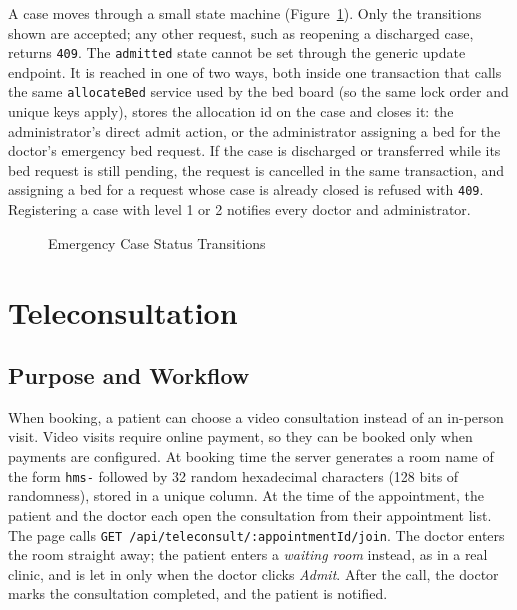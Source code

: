 A case moves through a small state machine (Figure~\ref{fig:erstates}). Only the transitions shown are accepted; any other request, such as reopening a discharged case, returns \texttt{409}. The \texttt{admitted} state cannot be set through the generic update endpoint. It is reached in one of two ways, both inside one transaction that calls the same \texttt{allocateBed} service used by the bed board (so the same lock order and unique keys apply), stores the allocation id on the case and closes it: the administrator's direct admit action, or the administrator assigning a bed for the doctor's emergency bed request. If the case is discharged or transferred while its bed request is still pending, the request is cancelled in the same transaction, and assigning a bed for a request whose case is already closed is refused with \texttt{409}. Registering a case with level 1 or 2 notifies every doctor and administrator.

\begin{figure}[H]
\centering
{}
\caption{Emergency Case Status Transitions}
\label{fig:erstates}
\end{figure}

\FloatBarrier
\section{Teleconsultation}
\label{sec:mod-tele}

\subsection{Purpose and Workflow}

When booking, a patient can choose a video consultation instead of an in-person visit. Video visits require online payment, so they can be booked only when payments are configured. At booking time the server generates a room name of the form \texttt{hms-} followed by 32 random hexadecimal characters (128 bits of randomness), stored in a unique column. At the time of the appointment, the patient and the doctor each open the consultation from their appointment list. The page calls \texttt{GET /api/teleconsult/:appointmentId/join}. The doctor enters the room straight away; the patient enters a \emph{waiting room} instead, as in a real clinic, and is let in only when the doctor clicks \emph{Admit}. After the call, the doctor marks the consultation completed, and the patient is notified.

